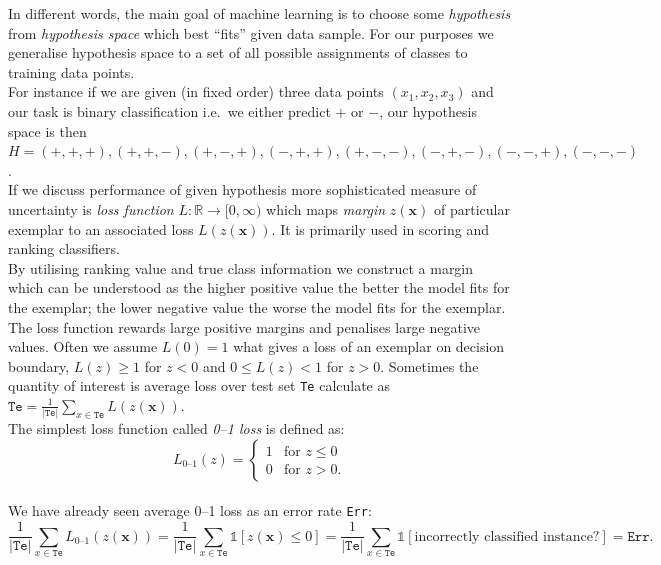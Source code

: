 \documentclass[12pt, a4paper, pdflatex, leqno]{report}
\begin{document}
In different words, the main goal of machine learning is to choose some \emph{hypothesis} from \emph{hypothesis space} which best ``fits'' given data sample. For our purposes we generalise hypothesis space to a set of all possible assignments of classes to training data points.\\
For instance if we are given (in fixed order) three data points $(x_1, x_2, x_3)$ and our task is binary classification i.e.\ we either predict $+$ or $-$, our hypothesis space is then $H = {(+, +, +), (+, +, -), (+, -, +), (-, +, +), (+, -, -), (-, +, -), (-, -, +), (-, -, -)}$.\\

If we discuss performance of given hypothesis more sophisticated measure of uncertainty is \emph{loss function} $L : \mathbb{R} \rightarrow [0, \infty)$ which maps \emph{margin} $z(\mathbf{x})$ of particular exemplar to an associated loss $L(z(\mathbf{x}))$. It is primarily used in scoring and ranking classifiers.\\
By utilising ranking value and true class information we construct a margin which can be understood as the higher positive value the better the model fits for the exemplar; the lower negative value the worse the model fits for the exemplar.\\
The loss function rewards large positive margins and penalises large negative values. Often we assume $L(0) = 1$ what gives a loss of an exemplar on decision boundary, $L(z) \geq 1$ for $z < 0$ and $0 \leq L(z) < 1$ for $z > 0$. Sometimes the quantity of interest is average loss over test set \texttt{Te} calculate as $\mathtt{Te} = \frac{1}{|\mathtt{Te}|} \sum_{x \in \mathtt{Te}} L(z(\mathbf{x}))$.\\
The simplest loss function called \emph{0--1 loss} is defined as:
\[
 L_{\text{0--1}} (z) =
  \begin{cases}
   1 & \text{for } z \leq 0 \\
   0 & \text{for } z > 0 \text{.}
  \end{cases}
\]~\\
We have already seen average 0--1 loss as an error rate \texttt{Err}:
\[ \frac{1}{|\mathtt{Te}|} \sum_{x \in \mathtt{Te}} L_{\text{0--1}}(z(\mathbf{x})) = 
   \frac{1}{|\mathtt{Te}|} \sum_{x \in \mathtt{Te}} \mathds{1} \left[ z(\mathbf{x}) \leq 0 \right] =
   \frac{1}{|\mathtt{Te}|} \sum_{x \in \mathtt{Te}} \mathds{1} \left[ \text{incorrectly classified instance?} \right] =
   \mathtt{Err}\text{.}
\]~\\
\end{document}
